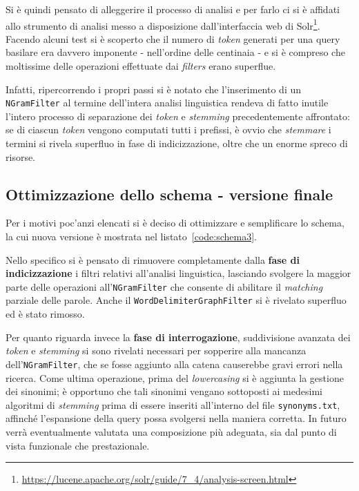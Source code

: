 \vspace{1em}

Si è quindi pensato di alleggerire il processo di analisi e per farlo ci si è affidati allo strumento di analisi messo a disposizione dall’interfaccia web di Solr\footnote{\url{https://lucene.apache.org/solr/guide/7_4/analysis-screen.html}}. Facendo alcuni test si è scoperto che il numero di \textit{token} generati per una query basilare era davvero imponente - nell’ordine delle centinaia - e si è compreso che moltissime delle operazioni effettuate dai \textit{filters} erano superflue.

Infatti, ripercorrendo i propri passi si è notato che l’inserimento di un \texttt{NGramFilter} al termine dell’intera analisi linguistica rendeva di fatto inutile l’intero processo di separazione dei \textit{token} e \textit{stemming} precedentemente affrontato: se di ciascun \textit{token} vengono computati tutti i prefissi, è ovvio che \textit{stemmare} i termini si rivela superfluo in fase di indicizzazione, oltre che un enorme spreco di risorse.



\subsection{Ottimizzazione dello schema - versione finale}

Per i motivi poc’anzi elencati si è deciso di ottimizzare e semplificare lo schema, la cui nuova versione è mostrata nel listato~\ref{code:schema3}.

\vspace{1em}

Nello specifico si è pensato di rimuovere completamente dalla \textbf{fase di indicizzazione} i filtri relativi all’analisi linguistica, lasciando svolgere la maggior parte delle operazioni all’\texttt{NGramFilter} che consente di abilitare il \textit{matching} parziale delle parole. Anche il \texttt{WordDelimiterGraphFilter} si è rivelato superfluo ed è stato rimosso.

Per quanto riguarda invece la \textbf{fase di interrogazione}, suddivisione avanzata dei \textit{token} e \textit{stemming} si sono rivelati necessari per sopperire alla mancanza dell’\texttt{NGramFilter}, che se fosse aggiunto alla catena causerebbe gravi errori nella ricerca. Come ultima operazione, prima del \textit{lowercasing} si è aggiunta la gestione dei sinonimi; è opportuno che tali sinonimi vengano sottoposti ai medesimi algoritmi di \textit{stemming} prima di essere inseriti all’interno del file \texttt{synonyms.txt}, affinché l’espansione della query possa svolgersi nella maniera corretta. In futuro verrà eventualmente valutata una composizione più adeguata, sia dal punto di vista funzionale che prestazionale.

